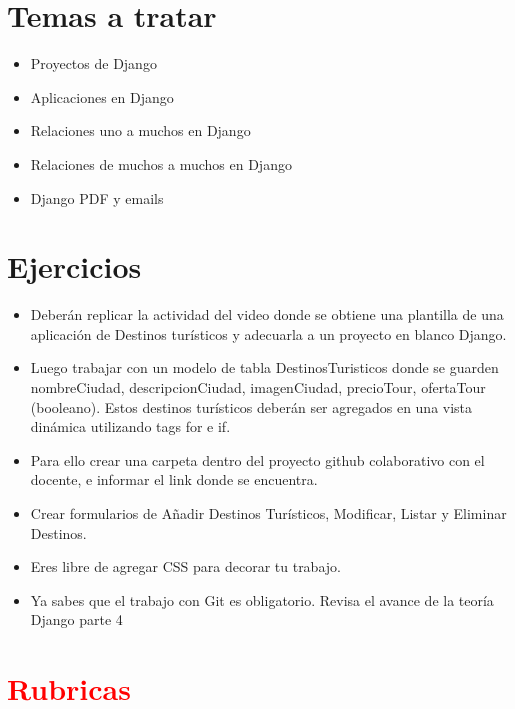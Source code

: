 \documentclass{article}
\begin{document}
\section{Temas a tratar}
        \begin{itemize}
            \item Proyectos de Django
            \item Aplicaciones en Django
            \item Relaciones uno a muchos en Django
            \item Relaciones de muchos a muchos en Django
            \item Django PDF y emails
        \end{itemize}
    
\section{Ejercicios}
\begin{itemize}
    \item Deberán replicar la actividad del video donde se obtiene una plantilla de una aplicación de Destinos turísticos y adecuarla a un proyecto en blanco Django.
    \item Luego trabajar con un modelo de tabla DestinosTuristicos donde se guarden nombreCiudad, descripcionCiudad, imagenCiudad, precioTour, ofertaTour (booleano). Estos destinos turísticos deberán ser agregados en una vista dinámica utilizando tags for e if.
    \item Para ello crear una carpeta dentro del proyecto github colaborativo con el docente, e informar el link donde se encuentra.
    \item Crear formularios de Añadir Destinos Turísticos, Modificar, Listar y Eliminar Destinos.
    \item Eres libre de agregar CSS para decorar tu trabajo.
    \item Ya sabes que el trabajo con Git es obligatorio. Revisa el avance de la teoría Django parte 4
\end{itemize} 

\section{\textcolor{red}{Rubricas}}
\end{document}
